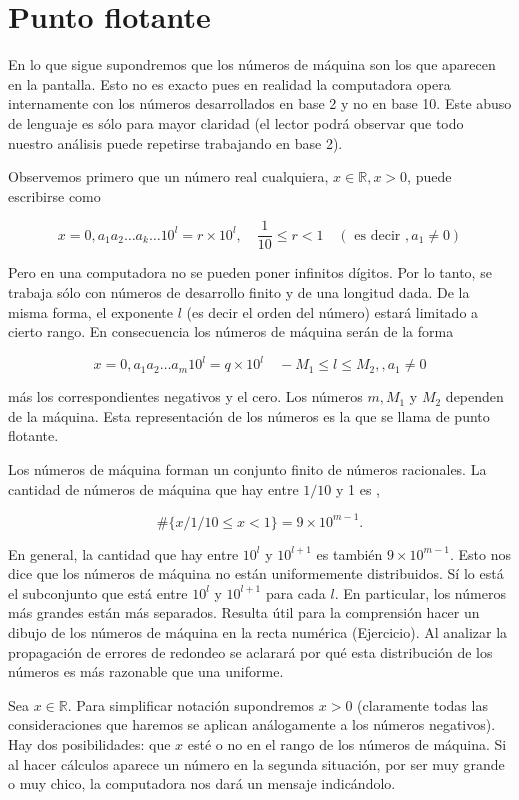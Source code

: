 \documentclass[10pt]{book}
\begin{document}
\section{Punto flotante}
En lo que sigue supondremos que los números de máquina son los que aparecen en la pantalla. Esto no es exacto pues en realidad la computadora opera internamente con los números desarrollados en base 2 y no en base 10. Este abuso de lenguaje es sólo para mayor claridad (el lector podrá observar que todo nuestro análisis puede repetirse trabajando en base 2).

Observemos primero que un número real cualquiera, $x \in \mathbb{R}, x>0$, puede escribirse como

$$
x=0, a_{1} a_{2} \ldots a_{k} \ldots 10^{l}=r \times 10^{l}, \quad \frac{1}{10} \leq r<1 \quad\left(\text { es decir }, a_{1} \neq 0\right)
$$

Pero en una computadora no se pueden poner infinitos dígitos. Por lo tanto, se trabaja sólo con números de desarrollo finito y de una longitud dada. De la misma forma, el exponente $l$ (es decir el orden del número) estará limitado a cierto rango. En consecuencia los números de máquina serán de la forma

$$
x=0, a_{1} a_{2} \ldots a_{m} 10^{l}=q \times 10^{l} \quad-M_{1} \leq l \leq M_{2},, a_{1} \neq 0
$$

más los correspondientes negativos y el cero. Los números $m, M_{1}$ y $M_{2}$ dependen de la máquina. Esta representación de los números es la que se llama de punto flotante.

Los números de máquina forman un conjunto finito de números racionales. La cantidad de números de máquina que hay entre $1 / 10$ y 1 es ,

$$
\#\{x / 1 / 10 \leq x<1\}=9 \times 10^{m-1} .
$$

En general, la cantidad que hay entre $10^{l}$ y $10^{l+1}$ es también $9 \times 10^{m-1}$. Esto nos dice que los números de máquina no están uniformemente distribuidos. Sí lo está el subconjunto que está entre $10^{l}$ y $10^{l+1}$ para cada $l$. En particular, los números más grandes están más separados. Resulta útil para la comprensión hacer un dibujo de los números de máquina en la recta numérica (Ejercicio). Al analizar la propagación de errores de redondeo se aclarará por qué esta distribución de los números es más razonable que una uniforme.

Sea $x \in \mathbb{R}$. Para simplificar notación supondremos $x>0$ (claramente todas las consideraciones que haremos se aplican análogamente a los números negativos). Hay dos posibilidades: que $x$ esté o no en el rango de los números de máquina. Si al hacer cálculos aparece un número en la segunda situación, por ser muy grande o muy chico, la computadora nos dará un mensaje indicándolo.
\end{document}
